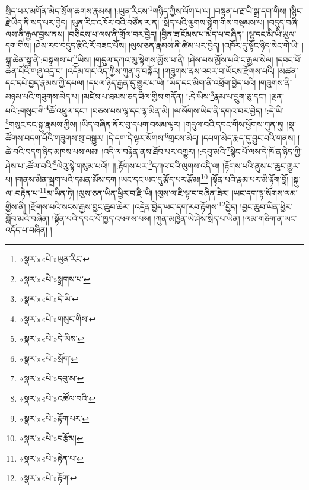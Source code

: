སྲིད་པར་མགོན་མེད་སྲོག་ཆགས་རྣམས། །:ཡུན་རིངས་\footnote{«སྣར་»«པེ་»ཡུན་རིང་}གཉིད་ཀྱིས་ལོག་པ་ལ། །བསྟན་པ་རྔ་ཡི་སྒྲ་དག་གིས། །སྙིང་རྗེ་ཡིད་ནི་སད་པར་བྱེད། །ཡུན་རིང་འཁོར་བའི་བཙོན་ར་ན། །སྲིད་པའི་ལྕགས་སྒྲོག་གིས་བསྡམས་པ། །བདུད་བཞི་ལས་ནི་རྒྱལ་བྱས་ནས། །བཅིངས་པ་ལས་ནི་གྲོལ་བར་བྱེད། །བྱིན་ཟ་ངོམས་པ་མེད་པ་བཞིན། །ལྷ་དང་མི་ཡི་ཡུལ་དག་གིས། །ཤེས་རབ་བདུད་རྩིའི་རོ་བཟང་པོས། །ལུས་ཅན་རྣམས་ནི་ཚིམ་པར་བྱེད། །འཁོར་དུ་སྟོང་ཉིད་སེང་གེ་ཡི། །སྒྲ་ཆེན་སྒྲ་ནི་:བསྒྲགས་པ་\footnote{«སྣར་»«པེ་»སྒྲགས་པ་}ཡིས། །གདུལ་དཀའ་མུ་སྟེགས་མྱོས་པ་ནི། །ཤེས་པས་མྱོས་པའི་ང་རྒྱལ་སེལ། །དབང་པོ་ཆེན་པོའི་གཞུ་འདྲ་བ། །འདོམ་གང་འོད་ཀྱིས་ཀུན་ཏུ་བསྐོར། །གཟུགས་ནས་འབར་བ་ཡོངས་རྫོགས་པའི། །མཚན་དང་དཔེ་བྱད་རྣམས་ཀྱི་དཔལ། །དཔལ་ཉིད་རྒྱན་དུ་གྱུར་པ་ཡི། །ཡིད་དང་མིག་ནི་འཕྲོག་བྱེད་པའི། །གཟུགས་ནི་མཉམ་པའི་གཟུགས་མེད་པ། །མཛེས་པ་ཐམས་ཅད་ཟིལ་གྱིས་གནོན། །:དེ་ཡིས་\footnote{«སྣར་»«པེ་»དེ་ཡི་}རྣམ་པ་དྲུག་ཅུ་དང་། །ལྡན་པའི་:གསུང་གི་\footnote{«སྣར་»«པེ་»གསུང་གིས་}ཆོ་འཕྲུལ་དང་། །བཅས་པས་ལྷ་དང་ལྷ་མིན་མི། །ལ་སོགས་ཡིད་ནི་དགའ་བར་བྱེད། །:དེ་ཡི་\footnote{«སྣར་»«པེ་»དེ་ཡིས་}གསུང་དང་སྐུ་རྣམས་ཀྱིས། །ཡིད་བཞིན་ནོར་བུ་དཔག་བསམ་ལྟར། །གདུལ་བའི་དབང་གིས་ཕྱོགས་ཀུན་ཏུ། །སྣ་ཚོགས་བདག་པོའི་གཟུགས་སུ་བསྒྱུར། །དེ་དག་དེ་ལྟར་སོགས་\footnote{«སྣར་»«པེ་»སྲོག་}གྲངས་མེད། །དཔག་མེད་རྨད་དུ་བྱུང་བའི་གནས། །ཆེ་བའི་བདག་ཉིད་མཁས་པས་ལམ། །འདི་ལ་བརྟེན་ནས་ཐོབ་པར་འགྱུར། །:དབུ་མའི་\footnote{«སྣར་»«པེ་»དབུ་མ་}སྙིང་པོ་ལས་དེ་ཁོ་ན་ཉིད་ཀྱི་ཤེས་པ་:ཚོལ་བའི་\footnote{«སྣར་»«པེ་»འཚོལ་བའི་}ལེའུ་སྟེ་གསུམ་པའོ།། །།:རྟོགས་པར་\footnote{«སྣར་»«པེ་»རྟོག་པར་}དཀའ་བའི་ལུགས་འདི་ལ། །རྟོགས་པའི་ནུས་པ་ཆུང་གྱུར་པ། །གནས་མིན་སྐྲག་པའི་དམན་མོས་དག །ཡང་དང་ཡང་དུ་རྩོད་པར་རྩོམ།\footnote{«སྣར་»«པེ་»བརྩོམ།} །སྟོན་པའི་རྣམ་པར་མི་རྟོག་བློ། །སྐུ་ལ་:བརྟེན་པ་\footnote{«སྣར་»«པེ་»རྟེན་པ་}མ་ཡིན་ཏེ། །ལུས་ཅན་ཡིན་ཕྱིར་བ་རྫི་ཡི། །ལུས་ལ་ཇི་ལྟ་བ་བཞིན་ཟེར། །ཡང་དག་ལྟ་སོགས་ལམ་གྱིས་ནི། །རྫོགས་པའི་སངས་རྒྱས་བྱང་ཆུབ་ཆེར། །འདྲེན་བྱེད་ཡང་དག་རབ་རྟོགས་\footnote{«སྣར་»«པེ་»རྟོག་}བྱེད། །བྱང་ཆུབ་ཡིན་ཕྱིར་སློབ་མའི་བཞིན། །སྟོན་པའི་དབང་པོ་ཁྱད་འཕགས་པས། །ཀུན་མཁྱེན་ཡེ་ཤེས་སྲིད་པ་ཡིན། །ལམ་གཅིག་ན་ཡང་འདོད་པ་བཞིན། །
